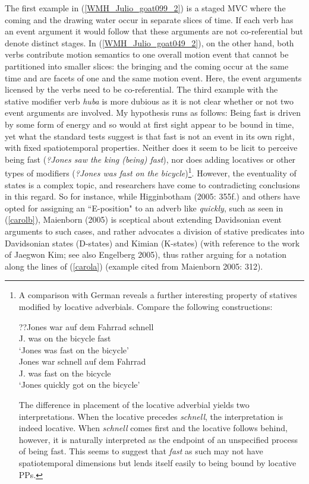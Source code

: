 The first example in (\ref{WMH_Julio_goat099_2}) is a staged MVC where the coming and the drawing water occur in separate slices of time. If each verb has an event argument it would follow that these arguments are not co-referential but denote distinct stages. In (\ref{WMH_Julio_goat049_2}), on the other hand, both verbs contribute motion semantics to one overall motion event that cannot be partitioned into smaller slices: the bringing and the coming occur at the same time and are facets of one and the same motion event. Here, the event arguments licensed by the verbs need to be co-referential. The third example with the stative modifier verb \textit{huba} is more dubious as it is not clear whether or not two event arguments are involved. My hypothesis runs as follows: Being fast is driven by some form of energy and so would at first sight appear to be bound in time, yet what the standard tests suggest is that fast is not an event in its own right, with fixed spatiotemporal properties. Neither does it seem to be licit to perceive being fast (\textit{?Jones saw the king (being) fast}), nor does adding locatives or other types of modifiers (\textit{?Jones was fast on the bicycle})\footnote{A comparison with German reveals a further interesting property of statives modified by locative adverbials. Compare the following constructions:

\pex \label{}
\ea
\gll ??Jones war auf dem Fahrrad schnell\\
J. was on the bicycle fast \\
\glft `Jones was fast on the bicycle'\\
\z
\ea
\gll Jones war schnell auf dem Fahrrad\\
J. was fast on the bicycle \\
\glft `Jones quickly got on the bicycle'\\
\z
\xe

The difference in placement of the locative adverbial yields two interpretations. When the locative precedes \textit{schnell}, the interpretation is indeed locative. When \textit{schnell} comes first and the locative follows behind, however, it is naturally interpreted as the endpoint of an unspecified process of being fast. This seems to suggest that \textit{fast} as such may not have spatiotemporal dimensions but lends itself easily to being bound by locative PPs.}. However, the eventuality of states is a complex topic, and researchers have come to contradicting conclusions in this regard. So for instance, while Higginbotham (2005: 355f.) and others have opted for assigning an ``E-position" to an adverb like \textit{quickly}, such as seen in (\ref{carolb}), Maienborn (2005) is sceptical about extending Davidsonian event arguments to such cases, and rather advocates a division of stative predicates into Davidsonian states (D-states) and Kimian (K-states) (with reference to the work of Jaegwon Kim; see also Engelberg 2005), thus rather arguing for a notation along the lines of (\ref{carola}) (example cited from Maienborn 2005: 312).

